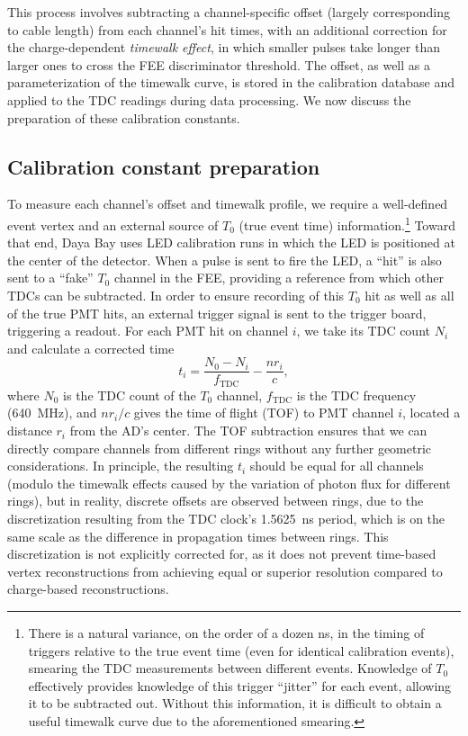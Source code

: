 \documentclass[../thesis.tex]{subfiles}
\begin{document}
This process involves subtracting a channel-specific offset (largely corresponding to cable length) from each channel's hit times, with an additional correction for the charge-dependent \emph{timewalk effect}, in which smaller pulses take longer than larger ones to cross the FEE discriminator threshold. The offset, as well as a parameterization of the timewalk curve, is stored in the calibration database and applied to the TDC readings during data processing. We now discuss the preparation of these calibration constants.

\subsection{Calibration constant preparation}

To measure each channel's offset and timewalk profile, we require a well-defined event vertex and an external source of $T_0$ (true event time) information.\footnote{There is a natural variance, on the order of a dozen ns, in the timing of triggers relative to the true event time (even for identical calibration events), smearing the TDC measurements between different events. Knowledge of $T_0$ effectively provides knowledge of this trigger ``jitter'' for each event, allowing it to be subtracted out. Without this information, it is difficult to obtain a useful timewalk curve due to the aforementioned smearing.} Toward that end, Daya Bay uses LED calibration runs in which the LED is positioned at the center of the detector. When a pulse is sent to fire the LED, a ``hit'' is also sent to a ``fake'' $T_0$ channel in the FEE, providing a reference from which other TDCs can be subtracted. In order to ensure recording of this $T_0$ hit as well as all of the true PMT hits, an external trigger signal is sent to the trigger board, triggering a readout. For each PMT hit on channel $i$, we take its TDC count $N_i$ and calculate a corrected time
\begin{equation}
  t_i = \frac{N_0 - N_i}{f_\mathrm{TDC}} - \frac{n r_i}{c},  
\end{equation}
where $N_0$ is the TDC count of the $T_0$ channel, $f_\mathrm{TDC}$ is the TDC frequency (640~MHz), and $nr_i/c$ gives the time of flight (TOF) to PMT channel $i$, located a distance $r_i$ from the AD's center. The TOF subtraction ensures that we can directly compare channels from different rings without any further geometric considerations. In principle, the resulting $t_i$ should be equal for all channels (modulo the timewalk effects caused by the variation of photon flux for different rings), but in reality, discrete offsets are observed between rings, due to the discretization resulting from the TDC clock's 1.5625~ns  period, which is on the same scale as the difference in propagation times between rings. This discretization is not explicitly corrected for, as it does not prevent time-based vertex reconstructions from achieving equal or superior resolution compared to charge-based reconstructions.
\end{document}
